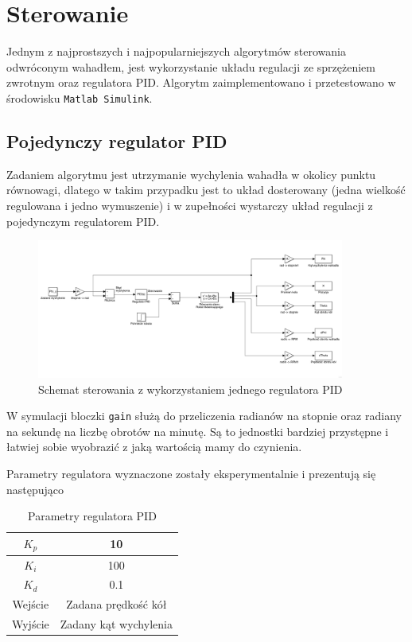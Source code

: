 \newpage

\section{Sterowanie}
Jednym z najprostszych i najpopularniejszych algorytmów sterowania odwróconym wahadłem, jest wykorzystanie układu regulacji ze sprzężeniem zwrotnym oraz regulatora PID. Algorytm zaimplementowano i przetestowano w środowisku \texttt{Matlab Simulink}.

\subsection{Pojedynczy regulator PID}
Zadaniem algorytmu jest utrzymanie wychylenia wahadła w okolicy punktu równowagi, dlatego w takim przypadku jest to układ dosterowany (jedna wielkość regulowana i jedno wymuszenie) i w zupełności wystarczy układ regulacji z pojedynczym regulatorem PID.
\begin{figure}[h!]
    \centering
	\includegraphics[width=0.9\textwidth]{Rysunki/Rozdzial02/Pojedynczy_PID.png}
	\caption{Schemat sterowania z wykorzystaniem jednego regulatora PID}
\end{figure}

W symulacji bloczki \texttt{gain} służą do przeliczenia radianów na stopnie oraz radiany na sekundę na liczbę obrotów na minutę. Są to jednostki bardziej przystępne i łatwiej sobie wyobrazić z jaką wartością mamy do czynienia.

Parametry regulatora wyznaczone zostały eksperymentalnie i prezentują się następująco
\begin{table}[h!]
    \centering
    \begin{tabular}{|c|c|}
        \hline
        $K_p$ & 10 \\
        \hline
        $K_i$ & 100 \\
        \hline
        $K_d$ & 0.1 \\
        \hline
        Wejście & Zadana prędkość kół \\
        \hline
        Wyjście & Zadany kąt wychylenia \\
        \hline
    \end{tabular}
        
    \caption{Parametry regulatora PID}
    \label{Parametry PID}
\end{table}

